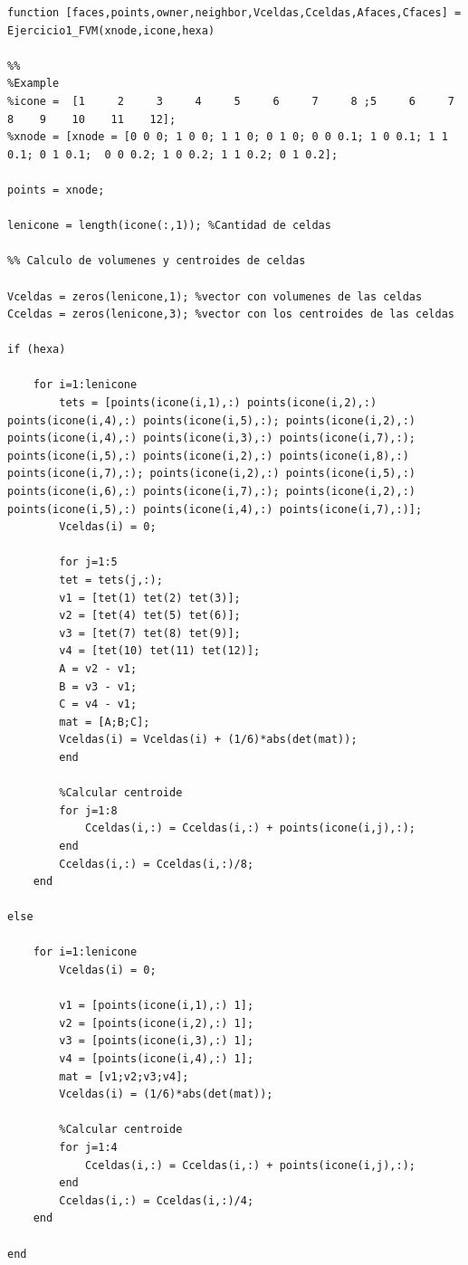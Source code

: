\documentclass[11pt]{article}
\begin{document}
\bigskip
\lstset{language=Matlab, breaklines=true, basicstyle=\footnotesize}
\begin{lstlisting}[frame=single]
function [faces,points,owner,neighbor,Vceldas,Cceldas,Afaces,Cfaces] = Ejercicio1_FVM(xnode,icone,hexa)

%%
%Example
%icone =  [1     2     3     4     5     6     7     8 ;5     6     7     8    9    10    11    12];
%xnode = [xnode = [0 0 0; 1 0 0; 1 1 0; 0 1 0; 0 0 0.1; 1 0 0.1; 1 1 0.1; 0 1 0.1;  0 0 0.2; 1 0 0.2; 1 1 0.2; 0 1 0.2];

points = xnode;

lenicone = length(icone(:,1)); %Cantidad de celdas

%% Calculo de volumenes y centroides de celdas

Vceldas = zeros(lenicone,1); %vector con volumenes de las celdas
Cceldas = zeros(lenicone,3); %vector con los centroides de las celdas

if (hexa)

    for i=1:lenicone
        tets = [points(icone(i,1),:) points(icone(i,2),:) points(icone(i,4),:) points(icone(i,5),:); points(icone(i,2),:) points(icone(i,4),:) points(icone(i,3),:) points(icone(i,7),:); points(icone(i,5),:) points(icone(i,2),:) points(icone(i,8),:) points(icone(i,7),:); points(icone(i,2),:) points(icone(i,5),:) points(icone(i,6),:) points(icone(i,7),:); points(icone(i,2),:) points(icone(i,5),:) points(icone(i,4),:) points(icone(i,7),:)];
        Vceldas(i) = 0;

        for j=1:5
        tet = tets(j,:);
        v1 = [tet(1) tet(2) tet(3)];
        v2 = [tet(4) tet(5) tet(6)];
        v3 = [tet(7) tet(8) tet(9)];
        v4 = [tet(10) tet(11) tet(12)];
        A = v2 - v1;
        B = v3 - v1;
        C = v4 - v1;
        mat = [A;B;C];
        Vceldas(i) = Vceldas(i) + (1/6)*abs(det(mat));
        end

        %Calcular centroide
        for j=1:8
            Cceldas(i,:) = Cceldas(i,:) + points(icone(i,j),:);
        end
        Cceldas(i,:) = Cceldas(i,:)/8;
    end

else
    
    for i=1:lenicone
        Vceldas(i) = 0;
        
        v1 = [points(icone(i,1),:) 1];
        v2 = [points(icone(i,2),:) 1];
        v3 = [points(icone(i,3),:) 1];
        v4 = [points(icone(i,4),:) 1];
        mat = [v1;v2;v3;v4];
        Vceldas(i) = (1/6)*abs(det(mat));

        %Calcular centroide
        for j=1:4
            Cceldas(i,:) = Cceldas(i,:) + points(icone(i,j),:);
        end
        Cceldas(i,:) = Cceldas(i,:)/4;
    end
    
end
\end{lstlisting}
\bigskip 
\end{document}
